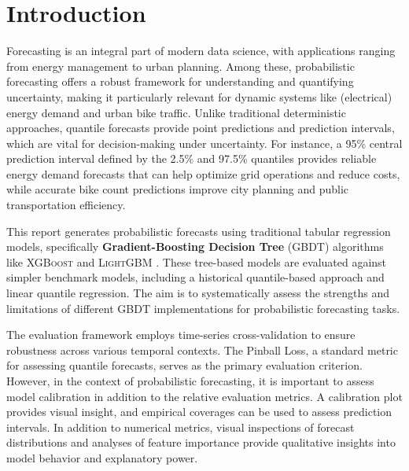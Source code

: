 \section{Introduction}
\label{ch:Introduction}

Forecasting is an integral part of modern data science, with applications ranging from energy management to urban planning. Among these, probabilistic forecasting offers a robust framework for understanding and quantifying uncertainty, making it particularly relevant for dynamic systems like (electrical) energy demand and urban bike traffic. Unlike traditional deterministic approaches, quantile forecasts provide point predictions and prediction intervals, which are vital for decision-making under uncertainty. For instance, a 95\% central prediction interval defined by the 2.5\% and 97.5\% quantiles provides reliable energy demand forecasts that can help optimize grid operations and reduce costs, while accurate bike count predictions improve city planning and public transportation efficiency.

This report generates probabilistic forecasts using traditional tabular regression models, specifically \textbf{Gradient-Boosting Decision Tree} (GBDT) algorithms like \textsc{XGBoost} \parencite{chen_xgboost_2016} and \textsc{LightGBM} \parencite{ke_lightgbm_2017}. These tree-based models are evaluated against simpler benchmark models, including a historical quantile-based approach and linear quantile regression. The aim is to systematically assess the strengths and limitations of different GBDT implementations for probabilistic forecasting tasks.

The evaluation framework employs time-series cross-validation to ensure robustness across various temporal contexts. The Pinball Loss, a standard metric for assessing quantile forecasts, serves as the primary evaluation criterion. However, in the context of probabilistic forecasting, it is important to assess model calibration in addition to the relative evaluation metrics. A calibration plot provides visual insight, and empirical coverages can be used to assess prediction intervals.
In addition to numerical metrics, visual inspections of forecast distributions and analyses of feature importance provide qualitative insights into model behavior and explanatory power.

